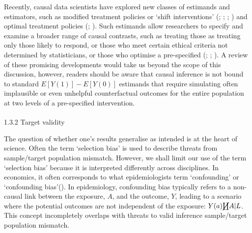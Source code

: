 \documentclass[
  singlecolumn]{article}
\makeatletter
\let\oldparagraph\paragraph
\renewcommand{\paragraph}{
    \@ifstar
      \xxxParagraphStar
      \xxxParagraphNoStar
  }
\newcommand{\xxxParagraphStar}[1]{\oldparagraph*{#1}\mbox{}}
\newcommand{\xxxParagraphNoStar}[1]{\oldparagraph{#1}\mbox{}}
\makeatother
\begin{document}
Recently, causal data scientists have explored new classes of estimands
and estimators, such as modified treatment policies or `shift
interventions' (;
;
;
) and optimal
treatment policies (;
). Such estimands
allow researchers to specify and examine a broader range of causal
contrasts, such as treating those as treating only those likely to
respond, or those who meet certain ethical criteria not determined by
statisticians, or those who optimise a pre-specified
(;
;
). A review of these
promising developments would take us beyond the scope of this
discussion, however, readers should be aware that causal inference is
not bound to standard \(E[Y(1)] - E[Y(0)]\) estimands that require
simulating often implausible or even unhelpful counterfactual outcomes
for the entire population at two levels of a pre-specified intervention.

\paragraph{1.3.2 Target validity}\label{target-validity}

The question of whether one's results generalise as intended is at the
heart of science. Often the term `selection bias' is used to describe
threats from sample/target population mismatch. However, we shall limit
our use of the term `selection bias' because it is interpreted
differently across disciplines. In economics, it often corresponds to
what epidemiologists term `confounding' or `confounding
bias'(). In
epidemiology, confounding bias typically refers to a non-causal link
between the exposure, \(A\), and the outcome, \(Y\), leading to a
scenario where the potential outcomes are not independent of the
exposure: \(Y(a)\cancel\coprod A|L\). This concept incompletely overlaps
with threats to valid inference sample/target population mismatch.
\end{document}
